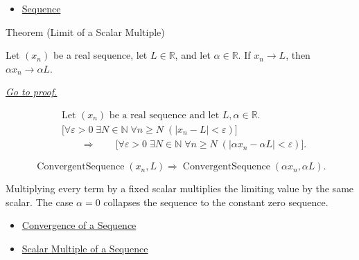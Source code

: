 \begin{dependencies}
\begin{itemize}
  \item \hyperref[def:sequence]{Sequence}
\end{itemize}
\end{dependencies}


\begin{theorembox}{Theorem (Limit of a Scalar Multiple)}
\begin{theorem}
\label{thm:limit-of-scalar-multiple}
Let $(x_n)$ be a real sequence, let $L\in\mathbb{R}$, and let
$\alpha\in\mathbb{R}$. If $x_n\to L$, then $\alpha x_n\to \alpha L$.

\smallskip
\noindent
\hyperref[prf:limit-of-scalar-multiple]{\textit{Go to proof.}}
\end{theorem}
\end{theorembox}

\begin{remark*}
\[
\begin{aligned}
&\text{Let } (x_n) \text{ be a real sequence and let }
  L,\alpha\in\mathbb{R}.\\
&\bigl[
\forall \varepsilon>0\;\exists N\in\mathbb{N}\;\forall n\ge N\;
(|x_n-L|<\varepsilon)
\bigr]\\
&\qquad\Longrightarrow\qquad
\bigl[
\forall \varepsilon>0\;\exists N\in\mathbb{N}\;\forall n\ge N\;
(|\alpha x_n-\alpha L|<\varepsilon)
\bigr].
\end{aligned}
\]
\end{remark*}

\begin{remark*}
\[
\operatorname{ConvergentSequence}(x_n,L)
\Longrightarrow
\operatorname{ConvergentSequence}(\alpha x_n,\alpha L).
\]
\end{remark*}

\begin{remark*}[Interpretation]
Multiplying every term by a fixed scalar multiplies the limiting value by the
same scalar. The case $\alpha=0$ collapses the sequence to the constant zero
sequence.
\end{remark*}

\begin{dependencies}
\begin{itemize}
  \item \hyperref[def:convergent-sequence]{Convergence of a Sequence}
  \item \hyperref[def:scalar-multiple-sequence]{Scalar Multiple of a Sequence}
\end{itemize}
\end{dependencies}

